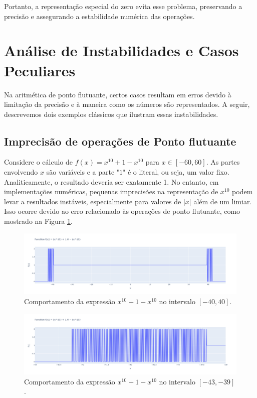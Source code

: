 Portanto, a representação especial do zero evita esse problema, preservando a precisão e assegurando a estabilidade numérica das operações.

\section{Análise de Instabilidades e Casos Peculiares}

Na aritmética de ponto flutuante, certos casos resultam em erros devido à limitação da precisão e à maneira como os números são representados. A seguir, descrevemos dois exemplos clássicos que ilustram essas instabilidades.

\subsection{Imprecisão de operações de Ponto flutuante}
Considere o cálculo de $f(x) = x^{10} + 1 - x^{10}$ para \(x \in [-60, 60]\). As partes envolvendo $x$ são variáveis e a parte "$1$" é o literal, ou seja, um valor fixo. Analiticamente, o resultado deveria ser exatamente 1. No entanto, em implementações numéricas, pequenas imprecisões na representação de \(x^{10}\) podem levar a resultados instáveis, especialmente para valores de \(|x|\) além de um limiar. Isso ocorre devido ao erro relacionado às operações de ponto flutuante, como mostrado na Figura \ref{fig:catastrofic_cancelation}. 

\begin{figure}[h]
    \centering 
    \includegraphics[width=1\textwidth]{Imagens/catastrofic_cancelation.png}
    \caption{Comportamento da expressão \(x^{10} + 1 - x^{10}\) no intervalo \([-40, 40]\).}
    \label{fig:catastrofic_cancelation}
\end{figure}
\begin{figure}[h]
    \centering 
    \includegraphics[width=1\textwidth]{Imagens/zoom.png}
    \caption{Comportamento da expressão \(x^{10} + 1 - x^{10}\) no intervalo \([-43, -39]\).}
    \label{fig:zoom}
\end{figure}

